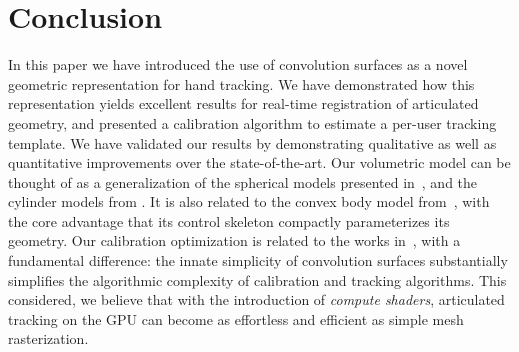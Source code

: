 \section{Conclusion}
\label{sec:conclusion}

In this paper we have introduced the use of convolution surfaces as a novel geometric representation for hand tracking. We have demonstrated how this representation yields excellent results for real-time registration of articulated geometry, and presented a calibration algorithm to estimate a per-user tracking template. We have validated our results by demonstrating qualitative as well as quantitative improvements over the state-of-the-art. Our volumetric model can be thought of as a generalization of the spherical models presented in~\cite{sridhar2015fast,qian2014realtime}, and the cylinder models from \cite{oiko2011hand,tagliasacchi2015robust}. It is also related to the convex body model from~\cite{melax2013dynamics}, with the core advantage that its control skeleton compactly parameterizes its geometry. Our calibration optimization is related to the works in~\cite{taylor2014user,khamis15learning,tan2016fitsglove}, with a fundamental difference: the innate simplicity of convolution surfaces substantially simplifies the algorithmic complexity of calibration and tracking algorithms. This considered, we believe that with the introduction of \emph{compute shaders}, articulated tracking on the GPU can become as effortless and efficient as simple mesh rasterization.

